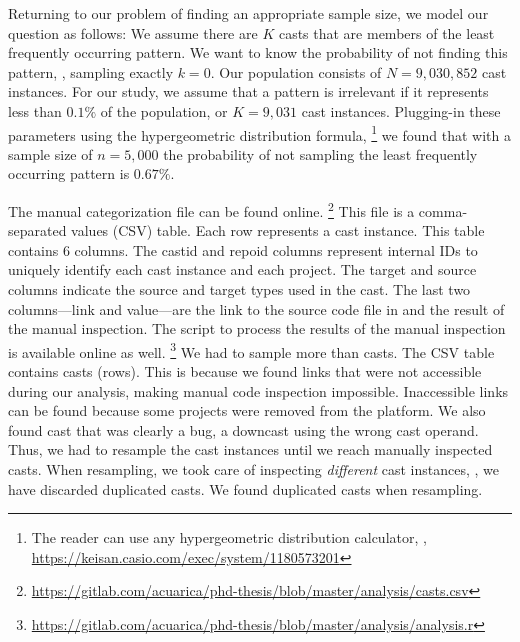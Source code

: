 Returning to our problem of finding an appropriate sample size, we model our question as follows:
We assume there are $K$ casts that are members of the least frequently occurring pattern.
We want to know the probability of not finding this pattern, \ie, sampling exactly $k = 0$.
Our population consists of $N = 9,030,852$ cast instances.
For our study, we assume that a pattern is irrelevant if it represents less than $0.1\%$ of the population, or $K = 9,031$ cast instances.
Plugging-in these parameters using the hypergeometric distribution formula,%
\footnote{The reader can use any hypergeometric distribution calculator, \eg{}, \url{https://keisan.casio.com/exec/system/1180573201}}
we found that with a sample size of $n = 5,000$ the probability of not sampling the
least frequently occurring pattern is $0.67\%$.

\newcommand\col[1]{\textsf{#1}}
The manual categorization file can be found online.%
\footnote{\url{https://gitlab.com/acuarica/phd-thesis/blob/master/analysis/casts.csv}}
This file is a comma-separated values (CSV) table.
Each row represents a cast instance.
This table contains 6 columns.
The \col{castid} and \col{repoid} columns represent internal IDs to uniquely identify each cast instance and each project.
The \col{target} and \col{source} columns indicate the source and target types used in the cast.
The last two columns---\col{link} and \col{value}---are the link to the source code file in \lgtm{} and the result of the manual inspection.
The script to process the results of the manual inspection is available online as well.%
\footnote{\url{https://gitlab.com/acuarica/phd-thesis/blob/master/analysis/analysis.r}}
We had to sample more than \nSize{} casts.
The CSV table contains \nSeen{} casts (rows).
This is because we found \nBrokenLink{} links that were not accessible during our analysis,
making manual code inspection impossible.
Inaccessible links can be found because some projects were removed from the \lgtm{} platform.
We also found \nBug{} cast that was clearly a bug,
a downcast using the wrong cast operand.
Thus, we had to resample the cast instances until we reach \nSize{} manually inspected casts.
When resampling, we took care of inspecting \emph{different} cast instances, \ie{},
we have discarded duplicated casts.
We found \nDuplicated{} duplicated casts when resampling.
